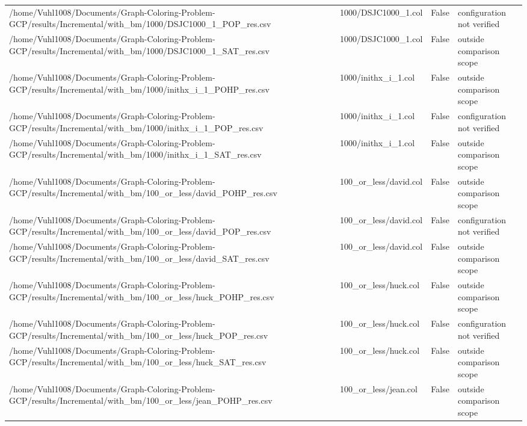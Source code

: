 \begin{table}[htbp]
\begin{tabular}{llll}
/home/Vuhl1008/Documents/Graph-Coloring-Problem-GCP/results/Incremental/with\_bm/1000/DSJC1000\_1\_POP\_res.csv & 1000/DSJC1000\_1.col & False & configuration not verified \\
/home/Vuhl1008/Documents/Graph-Coloring-Problem-GCP/results/Incremental/with\_bm/1000/DSJC1000\_1\_SAT\_res.csv & 1000/DSJC1000\_1.col & False & outside comparison scope \\
/home/Vuhl1008/Documents/Graph-Coloring-Problem-GCP/results/Incremental/with\_bm/1000/inithx\_i\_1\_POHP\_res.csv & 1000/inithx\_i\_1.col & False & outside comparison scope \\
/home/Vuhl1008/Documents/Graph-Coloring-Problem-GCP/results/Incremental/with\_bm/1000/inithx\_i\_1\_POP\_res.csv & 1000/inithx\_i\_1.col & False & configuration not verified \\
/home/Vuhl1008/Documents/Graph-Coloring-Problem-GCP/results/Incremental/with\_bm/1000/inithx\_i\_1\_SAT\_res.csv & 1000/inithx\_i\_1.col & False & outside comparison scope \\
/home/Vuhl1008/Documents/Graph-Coloring-Problem-GCP/results/Incremental/with\_bm/100\_or\_less/david\_POHP\_res.csv & 100\_or\_less/david.col & False & outside comparison scope \\
/home/Vuhl1008/Documents/Graph-Coloring-Problem-GCP/results/Incremental/with\_bm/100\_or\_less/david\_POP\_res.csv & 100\_or\_less/david.col & False & configuration not verified \\
/home/Vuhl1008/Documents/Graph-Coloring-Problem-GCP/results/Incremental/with\_bm/100\_or\_less/david\_SAT\_res.csv & 100\_or\_less/david.col & False & outside comparison scope \\
/home/Vuhl1008/Documents/Graph-Coloring-Problem-GCP/results/Incremental/with\_bm/100\_or\_less/huck\_POHP\_res.csv & 100\_or\_less/huck.col & False & outside comparison scope \\
/home/Vuhl1008/Documents/Graph-Coloring-Problem-GCP/results/Incremental/with\_bm/100\_or\_less/huck\_POP\_res.csv & 100\_or\_less/huck.col & False & configuration not verified \\
/home/Vuhl1008/Documents/Graph-Coloring-Problem-GCP/results/Incremental/with\_bm/100\_or\_less/huck\_SAT\_res.csv & 100\_or\_less/huck.col & False & outside comparison scope \\
/home/Vuhl1008/Documents/Graph-Coloring-Problem-GCP/results/Incremental/with\_bm/100\_or\_less/jean\_POHP\_res.csv & 100\_or\_less/jean.col & False & outside comparison scope \\

\end{tabular}
\end{table}
